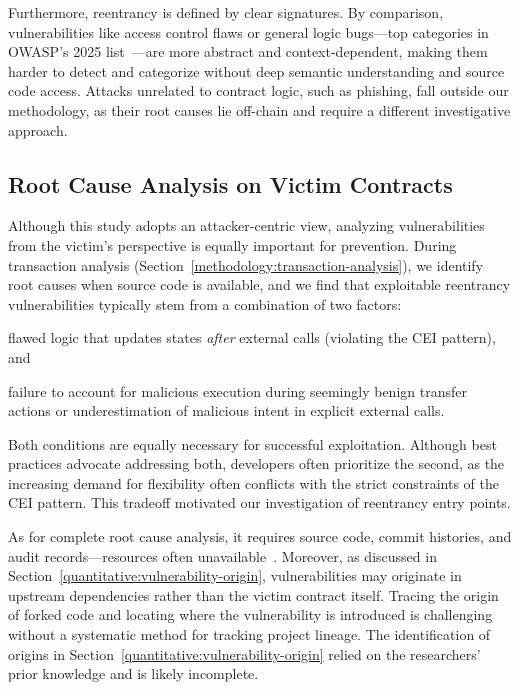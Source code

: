 Furthermore, reentrancy is defined by clear signatures. By comparison, vulnerabilities like access control flaws or general logic bugs—top categories in OWASP's 2025 list~\cite{top-smart-contract-attacks-2025}—are more abstract and context-dependent, making them harder to detect and categorize without deep semantic understanding and source code access. Attacks unrelated to contract logic, such as phishing, fall outside our methodology, as their root causes lie off-chain and require a different investigative approach.


\subsection{Root Cause Analysis on Victim Contracts}

Although this study adopts an attacker-centric view, analyzing vulnerabilities from the victim's perspective is equally important for prevention. During transaction analysis (Section~\ref{methodology:transaction-analysis}), we identify root causes when source code is available, and we find that exploitable reentrancy vulnerabilities typically stem from a combination of two factors:
\begin{enumerate*}
    \item flawed logic that updates states \textit{after} external calls (violating the CEI pattern), and
    \item failure to account for malicious execution during seemingly benign transfer actions or underestimation of malicious intent in explicit external calls.
\end{enumerate*}
Both conditions are equally necessary for successful exploitation. Although best practices advocate addressing both, developers often prioritize the second, as the increasing demand for flexibility often conflicts with the strict constraints of the CEI pattern. This tradeoff motivated our investigation of reentrancy entry points.

As for complete root cause analysis, it requires source code, commit histories, and audit records—resources often unavailable~\cite{wang2023empirical}. Moreover, as discussed in Section~\ref{quantitative:vulnerability-origin}, vulnerabilities may originate in upstream dependencies rather than the victim contract itself. Tracing the origin of forked code and locating where the vulnerability is introduced is challenging without a systematic method for tracking project lineage. The identification of origins in Section~\ref{quantitative:vulnerability-origin} relied on the researchers' prior knowledge and is  likely incomplete.


